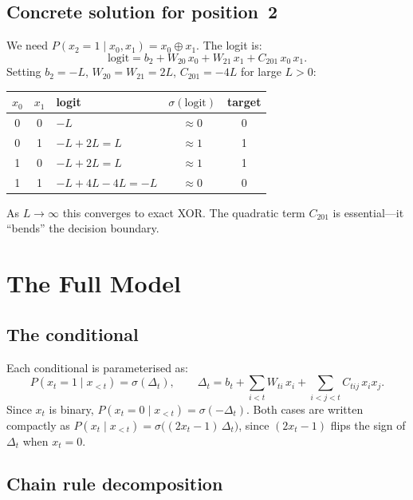 \documentclass[11pt]{article}
\begin{document}
\subsection{Concrete solution for position~2}

We need $P(x_2 = 1 \mid x_0, x_1) = x_0 \oplus x_1$.  The logit is:
\[
  \text{logit} = b_2 + W_{20}\,x_0 + W_{21}\,x_1
                 + C_{201}\,x_0\,x_1.
\]
Setting $b_2 = -L$, $W_{20} = W_{21} = 2L$, $C_{201} = -4L$ for
large $L > 0$:
\begin{center}
\begin{tabular}{cc|l|c|c}
\toprule
$x_0$ & $x_1$ & logit & $\sigma(\text{logit})$ & target \\
\midrule
0 & 0 & $-L$         & $\approx 0$ & 0 \\
0 & 1 & $-L+2L = L$  & $\approx 1$ & 1 \\
1 & 0 & $-L+2L = L$  & $\approx 1$ & 1 \\
1 & 1 & $-L+4L-4L = -L$ & $\approx 0$ & 0 \\
\bottomrule
\end{tabular}
\end{center}
As $L \to \infty$ this converges to exact XOR.  The quadratic term
$C_{201}$ is essential---it ``bends'' the decision boundary.

\section{The Full Model}\label{sec:full_model}

\subsection{The conditional}

Each conditional is parameterised as:
\begin{equation}\label{eq:logit}
  P(x_t = 1 \mid x_{<t}) = \sigma(\Delta_t),
  \qquad
  \Delta_t = b_t + \sum_{i<t} W_{ti}\, x_i
             + \sum_{i<j<t} C_{tij}\, x_i x_j.
\end{equation}
Since $x_t$ is binary, $P(x_t = 0 \mid x_{<t}) = \sigma(-\Delta_t)$.
Both cases are written compactly as
$P(x_t \mid x_{<t}) = \sigma\bigl((2x_t - 1)\,\Delta_t\bigr)$,
since $(2x_t - 1)$ flips the sign of $\Delta_t$ when $x_t = 0$.

\subsection{Chain rule decomposition}
\end{document}
